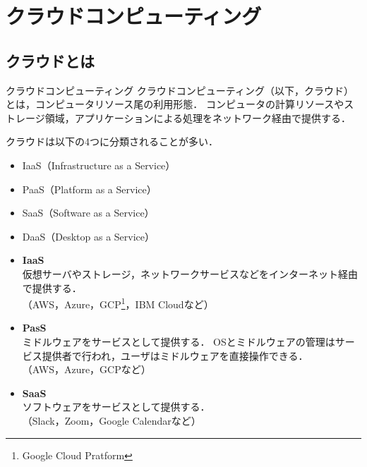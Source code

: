 \section{クラウドコンピューティング}
\tocc
\subsection{クラウドとは}
\begin{frame}[t]{\ftitle}
    \begin{block}{クラウドコンピューティング}
        クラウドコンピューティング（以下，クラウド）とは，コンピュータリソース尾の利用形態．
        コンピュータの計算リソースやストレージ領域，アプリケーションによる処理をネットワーク経由で提供する．\hfill\cite{2015amazon}
    \end{block}
    クラウドは以下の4つに分類されることが多い．
    \begin{itemize}
        \item IaaS（Infrastructure as a Service）
        \item PaaS（Platform as a Service）
        \item SaaS（Software as a Service）
        \item DaaS（Desktop as a Service）%
    \end{itemize}
\end{frame}
\begin{frame}[t]{\ftitle}
    \begin{itemize}
        \item \textbf{IaaS}\\
              仮想サーバやストレージ，ネットワークサービスなどをインターネット経由で提供する．\\（AWS，Azure，GCP\footnote{Google Cloud Pratform}，IBM Cloudなど）
        \item \textbf{PasS}\\
              ミドルウェアをサービスとして提供する．
              OSとミドルウェアの管理はサービス提供者で行われ，ユーザはミドルウェアを直接操作できる．\\（AWS，Azure，GCPなど）
        \item \textbf{SaaS}\\
              ソフトウェアをサービスとして提供する．\\（Slack，Zoom，Google Calendarなど）
    \end{itemize}
    \hfill\cite{2015amazon}
\end{frame}
